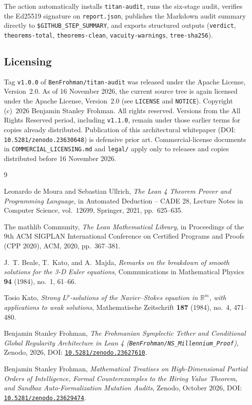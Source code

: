 \documentclass[11pt,a4paper]{article}
\theoremstyle{plain}
\theoremstyle{definition}
\begin{document}
The action automatically installs \texttt{titan-audit}, runs the six-stage audit, verifies the Ed25519 signature on \texttt{report.json}, publishes the Markdown audit summary directly to \texttt{\$GITHUB\_STEP\_SUMMARY}, and exports structured outputs (\texttt{verdict}, \texttt{theorems-total}, \texttt{theorems-clean}, \texttt{vacuity-warnings}, \texttt{tree-sha256}).

\subsection{Licensing}

Tag \texttt{v1.0.0} of \texttt{BenFrohman/titan-audit} was released under the Apache License, Version~2.0. As of 16 November 2026, the current source tree is again licensed under the Apache License, Version~2.0 (see \texttt{LICENSE} and \texttt{NOTICE}). Copyright (c)~2026 Benjamin Stanley Frohman. All rights reserved. Versions from the All Rights Reserved period, including \texttt{v1.1.0}, remain under those earlier terms for copies already distributed. Publication of this architectural whitepaper (DOI: \texttt{10.5281/zenodo.23630648}) is defensive prior art. Commercial-license documents in \texttt{COMMERCIAL\_LICENSING.md} and \texttt{legal/} apply only to releases and copies distributed before 16 November 2026.

\begin{thebibliography}{9}

Leonardo de Moura and Sebastian Ullrich,
\emph{The Lean 4 Theorem Prover and Programming Language},
in Automated Deduction -- CADE 28, Lecture Notes in Computer Science, vol.~12699, Springer, 2021, pp.~625--635.

The mathlib Community,
\emph{The Lean Mathematical Library},
in Proceedings of the 9th ACM SIGPLAN International Conference on Certified Programs and Proofs (CPP 2020), ACM, 2020, pp.~367--381.

J.~T. Beale, T.~Kato, and A.~Majda,
\emph{Remarks on the breakdown of smooth solutions for the 3-D Euler equations},
Communications in Mathematical Physics \textbf{94} (1984), no.~1, 61--66.

Tosio Kato,
\emph{Strong $L^p$-solutions of the Navier--Stokes equation in $\mathbb{R}^m$, with applications to weak solutions},
Mathematische Zeitschrift \textbf{187} (1984), no.~4, 471--480.

Benjamin Stanley Frohman,
\emph{The Frohmanian Symplectic Tether and Conditional Global Regularity Architecture in Lean 4 (\texttt{BenFrohman/NS\_Millennium\_Proof})},
Zenodo, 2026, DOI: \href{https://doi.org/10.5281/zenodo.23627610}{\texttt{10.5281/zenodo.23627610}}.

Benjamin Stanley Frohman,
\emph{Mathematical Treatises on High-Dimensional Partial Orders of Intelligence, Formal Counterexamples to the Hiring Value Theorem, and Sandbox Auto-Formalization Mutation Audits},
Zenodo, October 2026, DOI: \href{https://doi.org/10.5281/zenodo.23629474}{\texttt{10.5281/zenodo.23629474}}.

\end{thebibliography}
\end{document}
